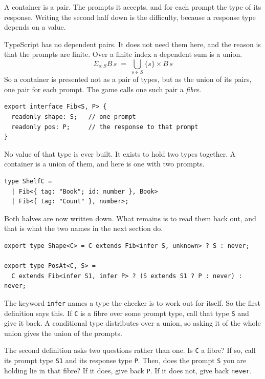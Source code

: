\documentclass[11pt,a4paper]{article}
\begin{document}
\begin{pinkbox}
A container is a pair. The prompts it accepts, and for each prompt the type of its response.
Writing the second half down is the difficulty, because a response type depends on a value.

TypeScript has no dependent pairs. It does not need them here, and the reason is that the prompts
are finite. Over a finite index a dependent sum is a union.
\[
  \Sigma_{s : S} B\,s \;=\; \bigcup_{s \in S} \{s\} \times B\,s
\]
So a container is presented not as a pair of types, but as the union of its pairs, one pair for
each prompt. The game calls one such pair a \emph{fibre}.

\begin{lstlisting}[language=TS]
export interface Fib<S, P> {
  readonly shape: S;   // one prompt
  readonly pos: P;     // the response to that prompt
}
\end{lstlisting}

No value of that type is ever built. It exists to hold two types together. A container is a union
of them, and here is one with two prompts.

\begin{lstlisting}[language=TS]
type ShelfC =
  | Fib<{ tag: "Book"; id: number }, Book>
  | Fib<{ tag: "Count" }, number>;
\end{lstlisting}

Both halves are now written down. What remains is to read them back out, and that is what the two
names in the next section do.

\begin{lstlisting}[language=TS]
export type Shape<C> = C extends Fib<infer S, unknown> ? S : never;

export type PosAt<C, S> =
  C extends Fib<infer S1, infer P> ? (S extends S1 ? P : never) : never;
\end{lstlisting}

The keyword \texttt{infer} names a type the checker is to work out for itself. So the first
definition says this. If \texttt{C} is a fibre over some prompt type, call that type \texttt{S} and
give it back. A conditional type distributes over a union, so asking it of the whole union gives
the union of the prompts.

The second definition asks two questions rather than one. Is \texttt{C} a fibre? If so, call its
prompt type \texttt{S1} and its response type \texttt{P}. Then, does the prompt \texttt{S} you are
holding lie in that fibre? If it does, give back \texttt{P}. If it does not, give back
\texttt{never}.


\end{pinkbox}
\end{document}
